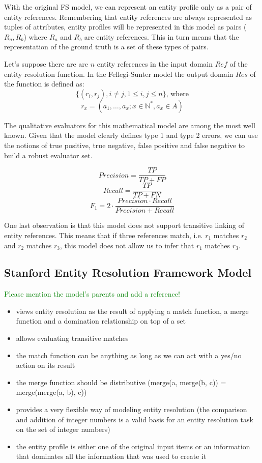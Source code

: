 \documentclass[11pt]{article}
\begin{document}
    With the original FS model, we can represent an entity profile only as a
    pair of entity references.
    Remembering that entity references are always represented as tuples of
    attributes, entity profiles will be represented in this model as pairs 
    ($R_a, R_b$) where $R_a$ and $R_b$ are entity references.
    This in turn means that the representation of the ground truth is a set
    of these types of pairs.

    Let's suppose there are are $n$ entity references in the input domain $Ref$
    of the entity resolution function. In the Fellegi-Sunter model the output domain
    $Res$ of the function is defined as:
    \[
        \{(r_i,r_j), i \neq j, 1 \leq i,j \leq n\}\textrm{, where}
    \]
    \[
        r_x=(a_1,\ldots,a_x; x \in \mathbb{N}^*, a_x \in A)
    \]

    The qualitative evaluators for this mathematical model are among the most
    well known.
    Given that the model clearly defines type 1 and type 2 errors, we can use
    the notions of true positive, true negative, false positive and false
    negative to build a robust evaluator set.
        
    $$Precision=\frac{TP}{TP+FP}$$
    $$Recall=\frac{TP}{TP+FN}$$
    $$F_1=2 \cdot \frac{Precision \cdot Recall}{Precision+Recall}$$

    One last observation is that this model does not support transitive
    linking of entity references\cite{Tal11}.
    This means that if three references match, i.e. $r_1$ matches $r_2$ and
    $r_2$ matches $r_3$, this model does not allow us to infer that $r_1$
    matches $r_3$.
    \subsection[serf]{Stanford Entity Resolution Framework Model}\label{subsec:serf}

    \textcolor{green}{Please mention the model's parents and add a reference!}
    \begin{itemize}
        \item views entity resolution as the result of applying a match function, a merge function and a domination relationship on top of a set
        \item allows evaluating transitive matches
        \item the match function can be anything as long as we can act with a yes/no action on its result
        \item the merge function should be distributive (merge(a, merge(b, c)) = merge(merge(a, b), c))
        \item provides a very flexible way of modeling entity resolution (the comparison and addition of integer numbers is a valid basis for an entity resolution task on the set of integer numbers)
        \item the entity profile is either one of the original input items or an information that dominates all the information that was used to create it
    \end{itemize}
\end{document}
